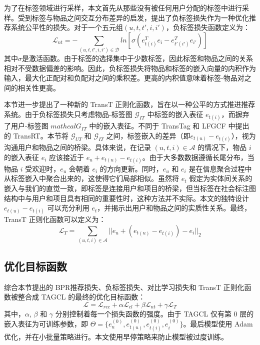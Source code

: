 为了在标签领域进行采样，本文首先从那些没有被任何用户分配的标签中进行采样。受到标签与物品之间交互分布差异的启发，提出了负标签损失作为一种优化推荐系统公平性的损失。对于一个五元组$(u, t, t', i, i')$，负标签损失函数定义为：
\begin{equation}
    \mathcal{L}_{nt} = -\sum_{(u, t, t', i, i')\in \mathcal{D}}ln[\sigma(e_{t(i)}^T e_i - e_{t'(i')}^T e_{i'})] 
\end{equation}
其中$\sigma$是激活函数。由于标签的选择集中于少数标签，因此标签和物品之间的关系相对不受数据偏差的影响。因此，负标签损失将物品和标签的嵌入向量的内积作为输入，最大化正配对和负配对之间的乘积差。更高的内积值意味着标签-物品对之间的相关性更高。

本节进一步提出了一种新的 TransT 正则化函数，旨在以一种公平的方式推进推荐系统。由于负标签损失只考虑物品-标签图 ${\mathcal{G}_{IT}}$ 中标签的嵌入表征 $e_{t(i)}$，而摒弃了用户-标签图 ${mathcal{G}_{IT}}$ 中的嵌入表征。不同于 TransTag\cite{chen_tgcn_2020} 和 LFGCF 中提出的 TransRT。本节将 $\mathcal{G}_{UT}$ 和 $\mathcal{G}_{IT}$ 之间，标签嵌入的差异（即$e_{t(u)} - e_{t(i)}$），视为沟通用户和物品之间的桥梁。具体来说，在记录 $(u, t, i) \in \mathcal{A}$ 的情况下，物品 $i$ 的嵌入表征 $e_i$ 应该接近于 $e_u + e_{t(u)} - e_{t(i)}$。由于大多数数据遵循长尾分布，当物品 $i$ 受欢迎时，$e_u$ 会朝着 $e_i$ 的方向更新。同时，$e_u$ 和 $e_i$ 是在信息聚合过程中从标签嵌入中聚合出来的，这使得它们局部相似。虽然将 $e_t$ 假定为实体间关系的嵌入与我们的直觉一致，即标签是连接用户和项目的桥梁，但当标签在社会标注图结构中与用户和项目具有相同的重要性时，这种方法并不实际。本文的独特设计 $e_{t(u)} - e_{t(i)}$ 可以充分利用 $e_t$，并揭示出用户和物品之间的实质性关系。最终，TransT 正则化函数可以定义为：
\begin{equation}
    \mathcal{L}_{T} = \sum_{(u, t, i) \in \mathcal{A}}||e_u + (e_{t(u)} - e_{t(i)}) - e_i||_2
\end{equation}

\subsection{优化目标函数}
综合本节提出的 BPR推荐损失、负标签损失、对比学习损失和 TransT 正则化函数被整合成 TAGCL 的最终的优化目标函数：
\begin{equation}
    \mathcal{L} = \mathcal{L}_{rec} + \alpha \mathcal{L}_{cl} + \beta \mathcal{L}_{nt} + \gamma \mathcal{L}_{T}
    \label{loss}
\end{equation}
其中，$\alpha$, $\beta$ 和 $\gamma$ 分别控制着每一个损失函数的强度。由于 TAGCL 仅有第 0 层的嵌入表征为可训练参数，即 $\Theta = \{e_u^{(0)}, e_{t(u)}^{(0)}, e_{t(i)}^{(0)}, e_i^{(0)}\}$。最后模型使用 Adam 优化，并在小批量策略进行。本文使用早停策略来防止模型被过度训练。
